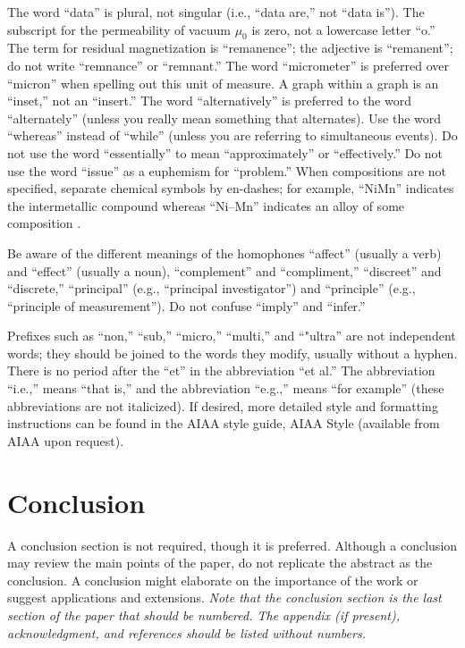 The word ``data'' is plural, not singular (i.e., ``data are,'' not ``data is''). The subscript for the permeability of vacuum $\mu_0$ is zero, not a lowercase letter ``o.'' The term for residual magnetization is ``remanence''; the adjective is ``remanent''; do not write ``remnance'' or ``remnant.'' The word ``micrometer'' is preferred over ``micron'' when spelling out this unit of measure. A graph within a graph is an ``inset,'' not an ``insert.'' The word ``alternatively'' is preferred to the word ``alternately'' (unless you really mean something that alternates). Use the word ``whereas'' instead of ``while'' (unless you are referring to simultaneous events). Do not use the word ``essentially'' to mean ``approximately'' or ``effectively.'' Do not use the word ``issue'' as a euphemism for ``problem.'' When compositions are not specified, separate chemical symbols by en-dashes; for example, ``NiMn'' indicates the intermetallic compound  whereas ``Ni--Mn'' indicates an alloy of some composition .

Be aware of the different meanings of the homophones ``affect'' (usually a verb) and ``effect'' (usually a noun), ``complement'' and ``compliment,'' ``discreet'' and ``discrete,'' ``principal'' (e.g., ``principal investigator'') and ``principle'' (e.g., ``principle of measurement''). Do not confuse ``imply'' and ``infer.''

Prefixes such as ``non,'' ``sub,'' ``micro,'' ``multi,'' and ``"ultra'' are not independent words; they should be joined to the words they modify, usually without a hyphen. There is no period after the ``et'' in the abbreviation ``et al.'' The abbreviation ``i.e.,'' means ``that is,'' and the abbreviation ``e.g.,'' means ``for example'' (these abbreviations are not italicized). If desired, more detailed style and formatting instructions can be found in the AIAA style guide, AIAA Style (available from AIAA upon request).


\section{Conclusion}
A conclusion section is not required, though it is preferred. Although a conclusion may review the main points of the paper, do not replicate the abstract as the conclusion. A conclusion might elaborate on the importance of the work or suggest applications and extensions. \textit{Note that the conclusion section is the last section of the paper that should be numbered. The appendix (if present), acknowledgment, and references should be listed without numbers.}


